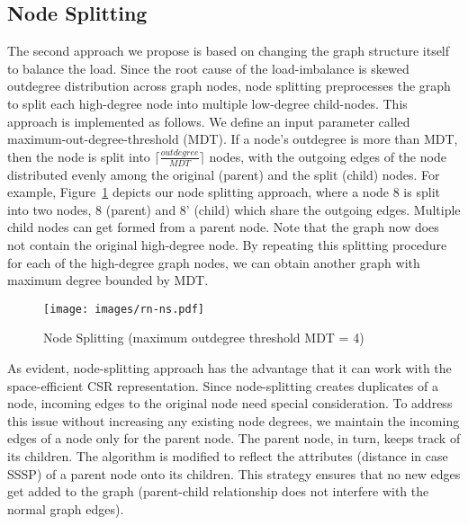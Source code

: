 \subsection{Node Splitting}\label{node-splitting}
The second approach we propose is based on changing the graph structure itself to balance the load.
Since the root cause of the load-imbalance is skewed outdegree distribution across graph nodes, node splitting preprocesses the graph to split each high-degree node into multiple low-degree child-nodes.
This approach is implemented as follows.
We define an input parameter called maximum-out-degree-threshold (MDT). 
If a node's outdegree is more than MDT, then the node is split into $\lceil\frac{outdegree}{MDT}\rceil$ nodes, with the outgoing edges of the node distributed evenly among the original (parent) and the split (child) nodes. 
For example, Figure~\ref{fig:ns} depicts our node splitting approach, where a node 8 is split into two nodes, 8 (parent) and 8' (child) which share the outgoing edges.
Multiple child nodes can get formed from a parent node. 
Note that the graph now does not contain the original high-degree node.
By repeating this splitting procedure for each of the high-degree graph nodes, we can obtain another graph with maximum degree bounded by MDT.

\begin{figure}
\centering
\texttt{[image: images/rn-ns.pdf]}
\caption{Node Splitting (maximum outdegree threshold MDT = 4)}
\label{fig:ns}
\end{figure}

As evident, node-splitting approach has the advantage that it can work with the space-efficient CSR representation.
Since node-splitting creates duplicates of a node, incoming edges to the original node need special consideration.
To address this issue without increasing any existing node degrees, we maintain the incoming edges of a node only for the parent node.
The parent node, in turn, keeps track of its children.
The algorithm is modified to reflect the attributes (distance in case SSSP) of a parent node onto its children.
This strategy ensures that no new edges get added to the graph (parent-child relationship does not interfere with the normal graph edges).

